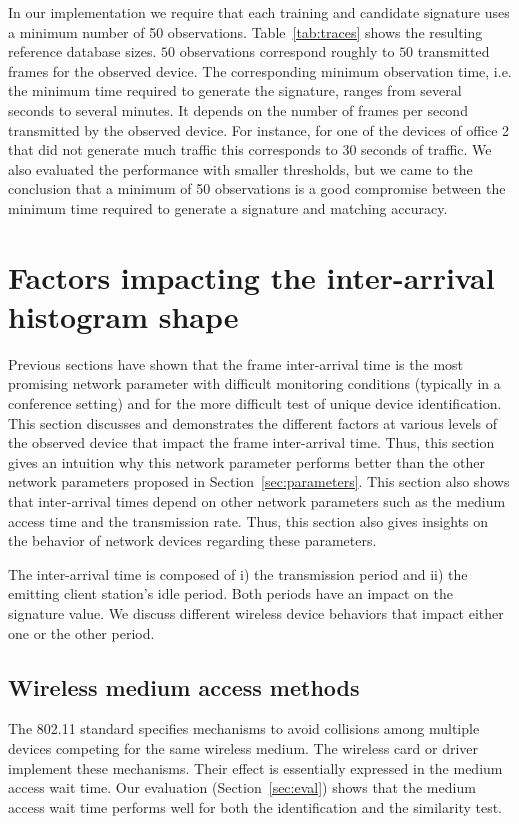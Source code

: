 \documentclass[10pt, conference, compsocconf, letterpaper]{IEEEtran}
\begin{document}
In our implementation we require that each training and candidate signature uses a
minimum number of 50 observations. Table~\ref{tab:traces} shows the resulting reference database sizes. $50$ observations correspond roughly to $50$ transmitted frames for the observed device.
The corresponding minimum observation time, i.e. the minimum time required to 
generate the signature, ranges from several seconds to several minutes.
It depends on the number of frames per second transmitted by the observed
device. For instance, for one of the devices of office 2 that did not generate much traffic this corresponds to 
30 seconds of traffic.
We also evaluated the performance with smaller thresholds, but we came to the conclusion 
that a minimum of 50 observations is a good compromise between the minimum time required to generate a signature and matching accuracy.

\section{Factors impacting the inter-arrival histogram shape}
\label{sec:factors}

Previous sections have shown that the frame inter-arrival time is the most promising network parameter 
with difficult monitoring conditions (typically in a conference setting) and for the more difficult 
test of unique device identification. This section discusses and demonstrates the different factors at various levels of the observed device that impact the frame inter-arrival time. 
Thus, this section gives an intuition why this network parameter performs better than the other network parameters proposed in Section~\ref{sec:parameters}.
This section also shows that inter-arrival times depend on other network parameters such as the medium access time and the transmission rate. Thus, this section also gives insights on the behavior of network devices regarding these parameters.

The inter-arrival time is composed of 
i) the transmission period and 
ii) the emitting client station's idle period.
Both periods have an impact on the signature value. We discuss different wireless device behaviors that impact either one or the other period.






\subsection{Wireless medium access methods}
\label{sec:accessmethods}
The 802.11 standard \cite{IEEE:80211} specifies mechanisms to avoid collisions among multiple devices competing for the same wireless medium. 
The wireless card or driver implement these mechanisms. Their effect is essentially expressed in the medium access wait time. 
Our evaluation (Section~\ref{sec:eval}) shows that the medium access wait time performs well for both the identification and the similarity test.
\end{document}
